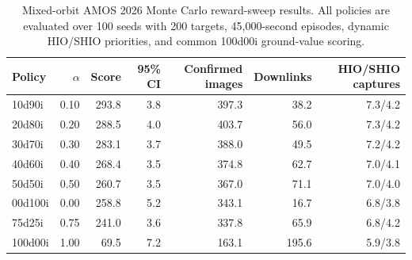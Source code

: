 \begin{table}[h!]
\centering
\caption{Mixed-orbit AMOS 2026 Monte Carlo reward-sweep results. All policies are evaluated over 100 seeds with 200 targets, 45,000-second episodes, dynamic HIO/SHIO priorities, and common 100d00i ground-value scoring.}
\label{tab:amos-mixed-reward-sweep}
\begin{tabular}{lrrrrrr}
\toprule
Policy & $\alpha$ & Score & 95\% CI & Confirmed images & Downlinks & HIO/SHIO captures \\
\midrule
10d90i & 0.10 & 293.8 & 3.8 & 397.3 & 38.2 & 7.3/4.2 \\
20d80i & 0.20 & 288.5 & 4.0 & 403.7 & 56.0 & 7.3/4.2 \\
30d70i & 0.30 & 283.1 & 3.7 & 388.0 & 49.5 & 7.2/4.2 \\
40d60i & 0.40 & 268.4 & 3.5 & 374.8 & 62.7 & 7.0/4.1 \\
50d50i & 0.50 & 260.7 & 3.5 & 367.0 & 71.1 & 7.0/4.0 \\
00d100i & 0.00 & 258.8 & 5.2 & 343.1 & 16.7 & 6.8/3.8 \\
75d25i & 0.75 & 241.0 & 3.6 & 337.8 & 65.9 & 6.8/4.2 \\
100d00i & 1.00 & 69.5 & 7.2 & 163.1 & 195.6 & 5.9/3.8 \\
\bottomrule
\end{tabular}
\end{table}

